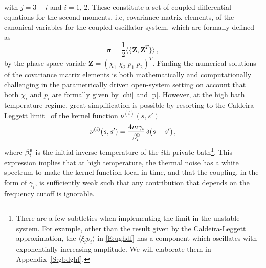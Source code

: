 \documentclass[11pt,a4paper]{article}
\begin{document}
with $j=3-i$ and $i=1$, 2. These constitute a set of coupled differential equations for the second moments, i.e, covariance matrix elements, of the canonical variables for the coupled oscillator system, which are formally defined as~\cite{PPTSimon,Illuminati04,HH15JHEP}
\begin{equation}
	\bm{\sigma} =\frac{1}{2}\langle \{\bm{Z},\bm{Z}^{T} \} \rangle \,,
\end{equation}
by the phase space variale $\bm{Z}=(\chi_{1}\;\chi_{2}\;p_{1}\;p_{2})^{T}$. Finding the numerical solutions of the covariance matrix elements is both mathematically and computationally challenging in the parametrically driven open-system setting on account that both $\chi_{i}$ and $p_{i}$ are formally given by \eqref{chi} and \eqref{p}. However, at the high bath temperature regime, great simplification is possible by resorting to the Caldeira-Leggett limit~\cite{hm94} of the kernel function $\nu^{(i)}(s,s')$
\begin{equation}
	\nu^{(i)}(s,s') = \frac{4m\gamma_{i}}{\beta_{i}^{\textsc{b}}}\,\delta(s-s')\,,
\end{equation}
where $\beta_{i}^{\textsc{b}}$ is the initial inverse temperature of the $i$th private bath\footnote{There are a few subtleties when implementing the limit in the unstable system. {For example, other than the result given by the Caldeira-Leggett approximation, the $\langle\xi_ip_i\rangle$ in \eqref{E:ughdf} has a component which oscillates with exponentially increasing amplitude.}  We will elaborate them in  Appendix~\ref{S:gbdghf}.}. This expression implies that at high temperature, the thermal noise has a white spectrum to make the kernel function local in time, and that the coupling, in the form of $\gamma_{i}$, is sufficiently weak such that any contribution that depends on the frequency cutoff is ignorable. 
\end{document}
